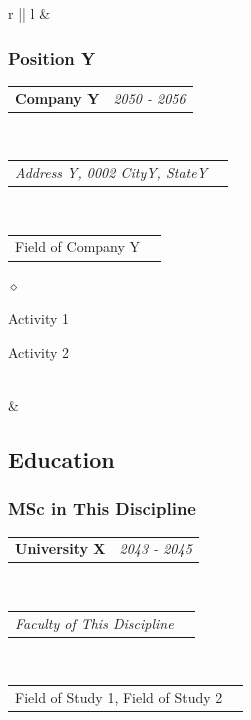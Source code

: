 \documentclass[a4paper]{article}
\makeatletter
\newlength{\sectsep}
\newlength{\subsectsep}
\newcommand{\headerrow}[2]
{\begin{tabular*}{\textwidth}{l@{\extracolsep{\fill}}r}
    #1 &
    #2 \\
\end{tabular*}}
\renewenvironment{itemize}{
  \begin{list}{$\diamond$}{
    \setlength{\topsep}{0.1em}
    \setlength{\itemsep}{0em}
    \setlength{\parskip}{0pt}
    \setlength{\parsep}{0em}
  }
}{
  \end{list}
}
\makeatother
\begin{document}
\begin{longtable}{r || l}
  & \begin{minipage}{0.9\textwidth}
      \vspace{\subsectsep}
      \subsubsection*{Position Y}
      \headerrow
        {\textbf{Company Y}}{\emph{2050 - 2056}}
      \\
      \headerrow
        {\emph{Address Y, 0002 CityY, StateY}}{}
      \\
      \headerrow
          {Field of Company Y}{}

      \begin{itemize}
          \item Activity 1
          \item Activity 2
      \end{itemize}
  \end{minipage} \\[\sectsep]


  & \begin{minipage}{0.9\textwidth}
      \vspace{\sectsep}
      \subsection*{Education}
      \subsubsection*{MSc in This Discipline}
      \headerrow
        {\textbf{University X}}{\emph{2043 - 2045}}
      \\
      \headerrow
        {\emph{Faculty of This Discipline}}{}
      \\
      \headerrow
        {Field of Study 1, Field of Study 2}{}


\end{minipage}
\end{longtable}
\end{document}
